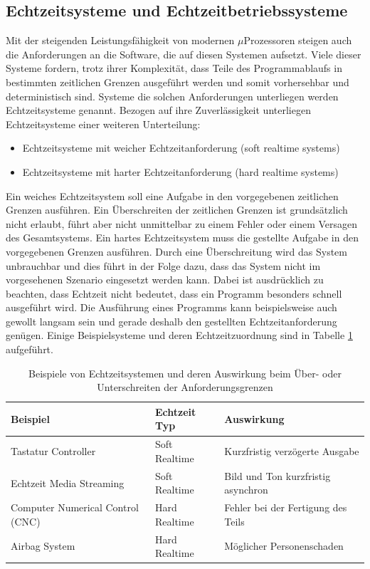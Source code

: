 

\subsection{Echtzeitsysteme und Echtzeitbetriebssysteme}
\label{sec:Echtzeitsysteme}
Mit der steigenden Leis\-tungs\-fähig\-keit von modernen $\mu$\-Pro\-zesso\-ren steigen auch die Anforderungen an die Software, die auf diesen Systemen aufsetzt. Viele dieser Systeme fordern, trotz ihrer Komplexität, dass Teile des Pro\-gramm\-ab\-laufs in bestimmten zeitlichen Grenzen ausgeführt werden und somit vorhersehbar und deterministisch sind.
Systeme die solchen Anforderungen unterliegen werden Echtzeitsysteme genannt. Bezogen auf ihre Zuverlässigkeit unterliegen Echtzeitsysteme einer weiteren Unterteilung:
\begin{itemize}
	\item Echtzeitsysteme mit weicher Echtzeitanforderung (soft realtime systems)
	\item Echtzeitsysteme mit harter Echtzeitanforderung (hard realtime systems)
\end{itemize}
   Ein weiches Echtzeitsystem soll eine Aufgabe in den vorgegebenen zeitlichen Grenzen ausführen. Ein Über\-schreiten der zeitlichen Grenzen ist grundsätzlich nicht erlaubt, führt aber nicht unmittelbar zu einem Fehler oder einem Versagen des Gesamtsystems. Ein hartes Echtzeitsystem muss die gestellte Aufgabe in den vorgegebenen Grenzen aus\-füh\-ren. Durch eine Überschreitung wird das System unbrauchbar und dies führt in der Folge dazu, dass das System nicht im vorgesehenen Szenario eingesetzt werden kann. Dabei ist ausdrücklich zu beachten, dass Echtzeit nicht bedeutet, dass ein Programm besonders schnell ausgeführt wird. Die Ausführung eines Programms kann beispielsweise auch gewollt langsam sein und gerade deshalb den gestellten Echtzeitanforderung genügen. Einige Beispielsysteme und deren Echtzeitzuordnung sind in Tabelle \ref{tab:BeispieleEchtzeitsystem} aufgeführt. 
\begin{table}
\centering
	\begin{tabular}{|l|l|l|}
		\hline
		\textbf{Beispiel} & \textbf{Echtzeit Typ}  & \textbf{Auswirkung} \\
		\hline
		Tastatur Controller & Soft Realtime & Kurzfristig verzögerte Ausgabe \\
		\hline
		Echtzeit Media Streaming  & Soft Realtime & Bild und Ton kurzfristig asynchron \\
		\hline
		Computer Numerical Control (CNC)  & Hard Realtime & Fehler bei der Fertigung des Teils\\
		\hline
		Airbag System  & Hard Realtime & Möglicher Personenschaden\\
		\hline
	\end{tabular}
	\caption{Beispiele von Echtzeitsystemen und deren Auswirkung beim Über- oder Unterschreiten der Anforderungsgrenzen}
	\label{tab:BeispieleEchtzeitsystem}
\end{table}
